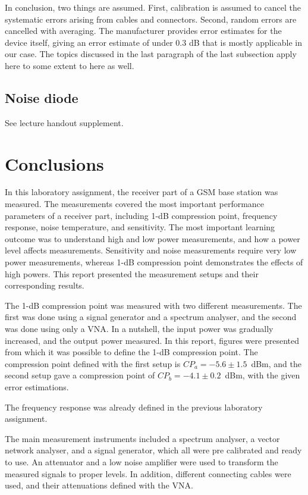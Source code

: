 \documentclass[a4paper, 12pt]{article}
\begin{document}
In conclusion, two things are assumed. First, calibration is assumed to cancel the 
systematic errors arising from cables and connectors. Second, random errors are 
cancelled with averaging. The manufacturer provides error estimates for the device 
itself, giving an error estimate of under $0.3$ dB that is mostly applicable in 
our case. The topics discussed in the last paragraph of the last subsection apply 
here to some extent to here as well.


\subsection{Noise diode}

See lecture handout supplement.


\newpage
\section{Conclusions}

In this laboratory assignment, the receiver part of a GSM base station was measured. The measurements covered the most important performance parameters of a receiver part, including 1-dB compression point, frequency response, noise temperature, and sensitivity. The most important learning outcome was to understand high and low power measurements, and how a power level affects measurements. Sensitivity and noise measurements require very low power measurements, whereas 1-dB compression point demonstrates the effects of high powers. This report presented the measurement setups and their corresponding results.

The 1-dB compression point was measured with two different measurements. The first was done using a signal generator and a spectrum analyser, and the second was done using only a VNA. In a nutshell, the input power was gradually increased, and the output power measured. In this report, figures were presented from which it was possible to define the 1-dB compression point. The compression point defined with the first setup is $CP_a = -5.6 \pm 1.5$~dBm, and the second setup gave a compression point of $CP_b = -4.1 \pm 0.2$~dBm, with the given error estimations.

The frequency response was already defined in the previous laboratory assignment. 

The main measurement instruments included a spectrum analyser, a vector network analyser, and a signal generator, which all were pre calibrated and ready to use. An attenuator and a low noise amplifier were used to transform the measured signals to proper levels. In addition, different connecting cables were used, and their attenuations defined with the VNA.
\end{document}
